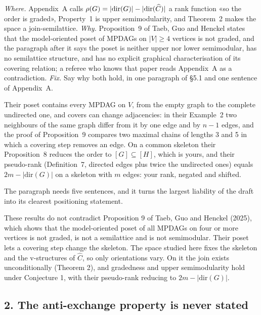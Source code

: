 \emph{Where.} Appendix~A calls $\rho(G) = |\mathrm{dir}(G)| - |\mathrm{dir}(\widehat{C})|$ a rank function «so
the order is graded», Property~1 is upper semimodularity, and Theorem~2 makes the space a
join-semilattice. \emph{Why.} Proposition~9 of Taeb, Guo and Henckel states that the model-oriented poset
of MPDAGs on $|V| \ge 4$ vertices is not graded, and the paragraph after it says the poset is neither upper
nor lower semimodular, has no semilattice structure, and has no explicit graphical characterisation of
its covering relation; a referee who knows that paper reads Appendix~A as a contradiction. \emph{Fix.}
Say why both hold, in one paragraph of \S5.1 and one sentence of Appendix~A.

\begin{fonte}
Their poset contains every MPDAG on $V$, from the empty graph to the complete undirected one, and covers
can change adjacencies: in their Example~2 two neighbours of the same graph differ from it by one edge
and by $n-1$ edges, and the proof of Proposition~9 compares two maximal chains of lengths 3 and 5 in
which a covering step removes an edge. On a common skeleton their Proposition~8 reduces the order to $[G] \subseteq [H]$,
which is yours, and their pseudo-rank (Definition~7, directed edges plus twice the undirected ones) equals
$2m - |\mathrm{dir}(G)|$ on a skeleton with $m$ edges: your rank, negated and shifted.
\end{fonte}

The paragraph needs five sentences, and it turns the largest liability of the draft into its clearest
positioning statement.

\begin{sonorio}
These results do not contradict Proposition 9 of Taeb, Guo and Henckel (2025), which shows that the
model-oriented poset of all MPDAGs on four or more vertices is not graded, is not a semilattice and is
not semimodular. Their poset lets a covering step change the skeleton. The space studied here fixes the
skeleton and the v-structures of $\widehat{C}$, so only orientations vary. On it the join exists
unconditionally (Theorem 2), and gradedness and upper semimodularity hold under Conjecture 1, with their
pseudo-rank reducing to $2m - |\mathrm{dir}(G)|$.
\end{sonorio}

\subsection*{2. The anti-exchange property is never stated}

